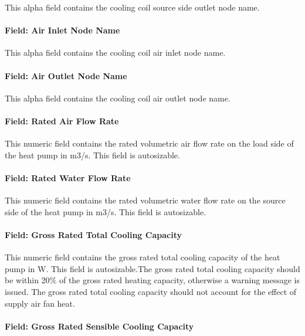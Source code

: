 This alpha field contains the cooling coil source side outlet node name.

\paragraph{Field: Air Inlet Node Name}\label{field-air-inlet-node-name-17}

This alpha field contains the cooling coil air inlet node name.

\paragraph{Field: Air Outlet Node Name}\label{field-air-outlet-node-name-17}

This alpha field contains the cooling coil air outlet node name.

\paragraph{Field: Rated Air Flow Rate}\label{field-rated-air-flow-rate-5}

This numeric field contains the rated volumetric air flow rate on the load side of the heat pump in m3/s. This field is autosizable.

\paragraph{Field: Rated Water Flow Rate}\label{field-rated-water-flow-rate}

This numeric field contains the rated volumetric water flow rate on the source side of the heat pump in m3/s. This field is autosizable.

\paragraph{Field: Gross Rated Total Cooling Capacity}\label{field-gross-rated-total-cooling-capacity-3}

This numeric field contains the gross rated total cooling capacity of the heat pump in W. This field is autosizable.The gross rated total cooling capacity should be within 20\% of the gross rated heating capacity, otherwise a warning message is issued. The gross rated total cooling capacity should not account for the effect of supply air fan heat.

\paragraph{Field: Gross Rated Sensible Cooling Capacity}\label{field-gross-rated-sensible-cooling-capacity}

